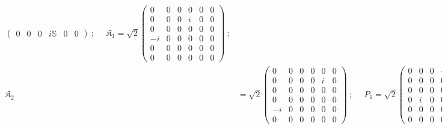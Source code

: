 \documentclass[]{article}
\numberwithin{equation}{section}
\begin{document}
{{\begin{align}
\begin{pmatrix}
        0&0&0&i\mathbb{S}&0&0
    \end{pmatrix}~;~~~~~~\mathfrak{K}_1=\sqrt{2}\begin{pmatrix}
    0&0&0&0&0&0\\
    0&0&0&i&0&0\\
    0&0&0&0&0&0\\
    -i&0&0&0&0&0\\
    0&0&0&0&0&0\\
    0&0&0&0&0&0
    \end{pmatrix}~;\nonumber\\
    \mathfrak{K}_2&=\sqrt{2}\begin{pmatrix}
    0&0&0&0&0&0\\
    0&0&0&0&i&0\\
    0&0&0&0&0&0\\
    0&0&0&0&0&0\\
    -i&0&0&0&0&0\\
    0&0&0&0&0&0
    \end{pmatrix}~;~~~~~~P_1=\sqrt{2}\begin{pmatrix}
    0&0&0&-i&0&0\\
    0&0&0&0&0&0\\
    0&0&0&0&0&0\\
    0&i&0&0&0&0\\
    0&0&0&0&0&0\\
    0&0&0&0&0&0
    \end{pmatrix}~;~~~~~~
    P_2=\sqrt{2}\begin{pmatrix}
    0&0&0&0&-i&0\\
    0&0&0&0&0&0\\
    0&0&0&0&0&0\\
    0&0&0&0&0&0\\
    0&i&0&0&0&0\\
    0&0&0&0&0&0
    \end{pmatrix}~.\nonumber
\end{align}
}}
\end{document}
